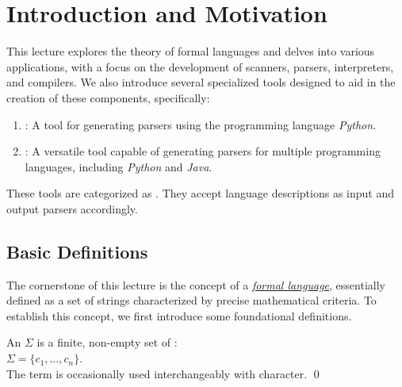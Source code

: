\chapter{Introduction and Motivation}
This lecture explores the theory of formal languages and delves into various applications, with a focus on the
development of scanners, parsers, interpreters, and compilers. We also introduce several specialized tools
designed to aid in the creation of these components, specifically: 
\begin{enumerate}
\item {}:  A tool for generating parsers using the programming language
      \textsl{Python}. 
\item {}:  A versatile tool capable of generating parsers for multiple
       programming languages, including \textsl{Python} and \textsl{Java}. 
\end{enumerate}
These tools are categorized as . They accept language descriptions as input and output
parsers accordingly. 

\section{Basic Definitions}
The cornerstone of this lecture is the concept of a \href{http://en.wikipedia.org/wiki/Formal_language}{\emph{formal language}},  essentially defined as a set of strings characterized by precise mathematical criteria. To establish this concept, we first introduce some foundational definitions.

\begin{Definition}[Alphabet]
An  \( \Sigma \)  is a finite, non-empty set of :
\\[0.2cm]
\hspace*{1.3cm}
\( \Sigma = \{ c_1, \ldots, c_n \} \).
\\[0.2cm]
The term   is occasionally used interchangeably with character.
\qed
\end{Definition}

